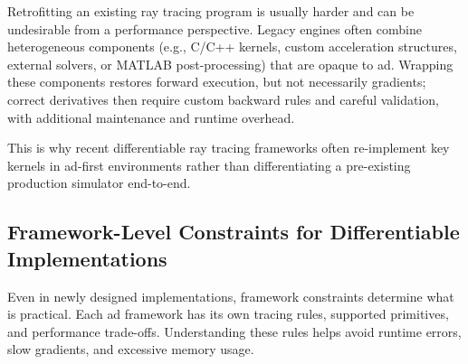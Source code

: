 \begin{listing}
  \caption{Various ways to differentiate the example function \eqref{eq:ad-example-function} with JAX: function definition. The $x$ and $y$ inputs are represented as a single JAX array, as JAX supports differentiating with respect to array arguments, and the function itself is defined using JAX primitives whose syntax is similar to standard NumPy operations.}
  \inputminted[firstline=7,lastline=24]{python}{codes/jax-ad.py}
\end{listing}

\begin{listing}
  \caption{Various ways to differentiate the example function \eqref{eq:ad-example-function} with JAX: the \texttt{jax.grad} function computes the gradient of a scalar output with respect to all inputs.}
  \inputminted[firstline=26,lastline=32]{python}{codes/jax-ad.py}
\end{listing}

\begin{listing}
  \caption{Various ways to differentiate the example function \eqref{eq:ad-example-function} with JAX: the \texttt{jax.jacobian} function computes the full Jacobian matrix.}
  \inputminted[firstline=34,lastline=39]{python}{codes/jax-ad.py}
\end{listing}

Retrofitting an existing ray tracing program is usually harder and can be undesirable from a performance perspective. Legacy engines often combine heterogeneous components (e.g., C/C++ kernels, custom acceleration structures, external solvers, or MATLAB post-processing) that are opaque to \gls{ad}. Wrapping these components restores forward execution, but not necessarily gradients; correct derivatives then require custom backward rules and careful validation, with additional maintenance and runtime overhead.

This is why recent differentiable ray tracing frameworks often re-implement key kernels in \gls{ad}-first environments rather than differentiating a pre-existing production simulator end-to-end.

\subsection{Framework-Level Constraints for Differentiable Implementations}

Even in newly designed implementations, framework constraints determine what is practical. Each \gls{ad} framework has its own tracing rules, supported primitives, and performance trade-offs. Understanding these rules helps avoid runtime errors, slow gradients, and excessive memory usage.

